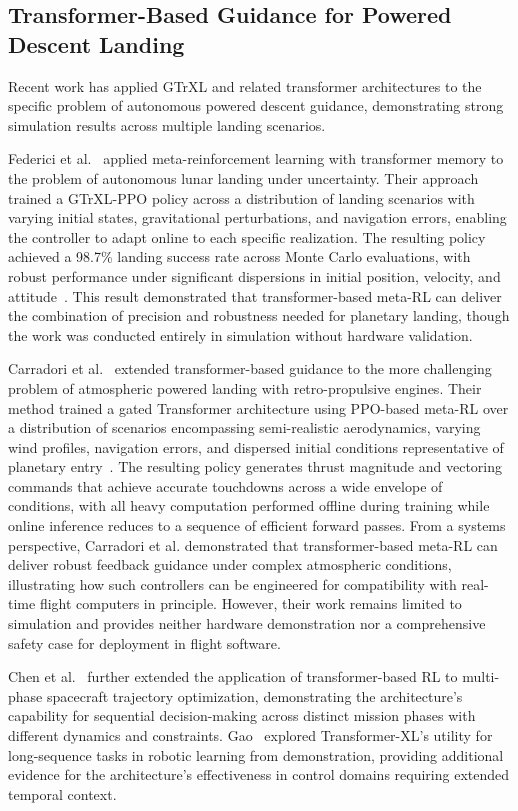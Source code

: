 \documentclass[10pt,twocolumn]{article}
\begin{document}
\subsection{Transformer-Based Guidance for Powered Descent Landing}

Recent work has applied GTrXL and related transformer architectures to the specific problem of autonomous powered descent guidance, demonstrating strong simulation results across multiple landing scenarios.

Federici et al.~\cite{federici2024} applied meta-reinforcement learning with transformer memory to the problem of autonomous lunar landing under uncertainty.
Their approach trained a GTrXL-PPO policy across a distribution of landing scenarios with varying initial states, gravitational perturbations, and navigation errors, enabling the controller to adapt online to each specific realization.
The resulting policy achieved a 98.7\% landing success rate across Monte Carlo evaluations, with robust performance under significant dispersions in initial position, velocity, and attitude~\cite{federici2024}.
This result demonstrated that transformer-based meta-RL can deliver the combination of precision and robustness needed for planetary landing, though the work was conducted entirely in simulation without hardware validation.

Carradori et al.~\cite{carradori2025} extended transformer-based guidance to the more challenging problem of atmospheric powered landing with retro-propulsive engines.
Their method trained a gated Transformer architecture using PPO-based meta-RL over a distribution of scenarios encompassing semi-realistic aerodynamics, varying wind profiles, navigation errors, and dispersed initial conditions representative of planetary entry~\cite{carradori2025}.
The resulting policy generates thrust magnitude and vectoring commands that achieve accurate touchdowns across a wide envelope of conditions, with all heavy computation performed offline during training while online inference reduces to a sequence of efficient forward passes.
From a systems perspective, Carradori et al. demonstrated that transformer-based meta-RL can deliver robust feedback guidance under complex atmospheric conditions, illustrating how such controllers can be engineered for compatibility with real-time flight computers in principle.
However, their work remains limited to simulation and provides neither hardware demonstration nor a comprehensive safety case for deployment in flight software.

Chen et al.~\cite{chen2024} further extended the application of transformer-based RL to multi-phase spacecraft trajectory optimization, demonstrating the architecture's capability for sequential decision-making across distinct mission phases with different dynamics and constraints.
Gao~\cite{gao2024} explored Transformer-XL's utility for long-sequence tasks in robotic learning from demonstration, providing additional evidence for the architecture's effectiveness in control domains requiring extended temporal context.
\end{document}
